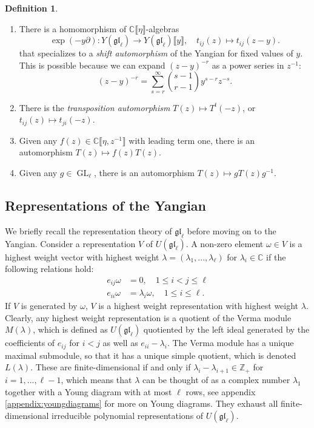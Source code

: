 \documentclass[11pt]{report}
\theoremstyle{definition}
\newtheorem{definition}[theorem]{Definition}
\theoremstyle{remark}
\theoremstyle{remark}
\newcommand{\Z}{\mathbb{Z}}
\newcommand{\C}{\mathbb{C}}
\begin{document}
\begin{definition}
\begin{enumerate}[label=(\roman*)]
\item There is a homomorphism of $\C\llbracket \eta \rrbracket$-algebras
\begin{equation*}
\exp(-y\partial): Y(\mathfrak{gl}_\ell) \to Y(\mathfrak{gl}_\ell)\llbracket y \rrbracket, \quad t_{ij}(z) \mapsto t_{ij}(z-y).
\end{equation*}
that specializes to a \emph{shift automorphism} of the Yangian for fixed values of $y$. This is possible because we can expand $(z-y)^{-r}$ as a power series in $z^{-1}$:
\begin{equation*}
(z-y)^{-r} = \sum_{s=r}^\infty {s-1 \choose r-1} y^{s-r} z^{-s}.
\end{equation*}
\item There is the \emph{transposition automorphism} $T(z) \mapsto T^t(-z)$, or $t_{ij}(z) \mapsto t_{ji}(-z)$.
\item Given any $f(z) \in \C\llbracket \eta,z^{-1} \rrbracket$ with leading term one, there is an automorphism $T(z) \mapsto f(z) T(z)$.
\item Given any $g \in \operatorname{GL}_\ell$, there is an automorphism $T(z) \mapsto g T(z) g^{-1}$.
\end{enumerate}
\end{definition}
 
\subsection{Representations of the Yangian}

We briefly recall the representation theory of $\mathfrak{gl}_\ell$ before moving on to the Yangian. Consider a representation $V$ of $U(\mathfrak{gl}_\ell)$. A non-zero element $\omega \in V$ is a highest weight vector with highest weight $\lambda = (\lambda_1,...,\lambda_\ell)$ for $\lambda_i \in \C$ if the following relations hold:
\begin{align*}
e_{ij} \omega &= 0, \quad 1 \leq i < j \leq \ell \\
e_{ii} \omega &= \lambda_i \omega, \quad 1 \leq i \leq \ell.
\end{align*}
If $V$ is generated by $\omega$, $V$ is a highest weight representation with highest weight $\lambda$. Clearly, any highest weight representation is a quotient of the Verma module $M(\lambda)$, which is defined as $U(\mathfrak{gl}_\ell)$ quotiented by the left ideal generated by the coefficients of $e_{ij}$ for $i<j$ as well as $e_{ii} - \lambda_i$. The Verma module has a unique maximal submodule, so that it has a unique simple quotient, which is denoted $L(\lambda)$. These are finite-dimensional if and only if $\lambda_i - \lambda_{i+1} \in \Z_+$ for $i=1,...,\ell-1$, which means that $\lambda$ can be thought of as a complex number $\lambda_1$ together with a Young diagram with at most $\ell$ rows, see appendix \ref{appendix:youngdiagrams} for more on Young diagrams. They exhaust all finite-dimensional irreducible polynomial representations of $U(\mathfrak{gl}_\ell)$.
\end{document}
